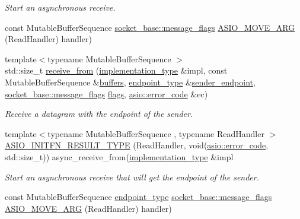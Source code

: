 \begin{DoxyCompactItemize}
\begin{DoxyCompactList}\small\item\em Start an asynchronous receive. \end{DoxyCompactList}\item 
const Mutable\+Buffer\+Sequence \hyperlink{classasio_1_1socket__base_ac3cf77465dfedfe1979b5415cf32cc94}{socket\+\_\+base\+::message\+\_\+flags} \hyperlink{classasio_1_1datagram__socket__service_a751d9e3b688d83f9af9c5e794574a2cc}{A\+S\+I\+O\+\_\+\+M\+O\+V\+E\+\_\+\+A\+R\+G} (Read\+Handler) handler)
\item 
{\footnotesize template$<$typename Mutable\+Buffer\+Sequence $>$ }\\std\+::size\+\_\+t \hyperlink{classasio_1_1datagram__socket__service_a84a1398434f93602d5f51d59974cbc49}{receive\+\_\+from} (\hyperlink{classasio_1_1datagram__socket__service_a41dcdc6b8a3500d6f88e10b6c08925cd}{implementation\+\_\+type} \&impl, const Mutable\+Buffer\+Sequence \&\hyperlink{classasio_1_1datagram__socket__service_a8d5deea235095a9d82c4d36af00eaa0f}{buffers}, \hyperlink{classasio_1_1datagram__socket__service_a135b71c44f1e92b67cea4402f46578a9}{endpoint\+\_\+type} \&\hyperlink{classasio_1_1datagram__socket__service_a5bfcc5dd1de590bc5c55e0c19db18773}{sender\+\_\+endpoint}, \hyperlink{classasio_1_1socket__base_ac3cf77465dfedfe1979b5415cf32cc94}{socket\+\_\+base\+::message\+\_\+flags} \hyperlink{classasio_1_1datagram__socket__service_a4bb3745dcca72273467ef14d34819736}{flags}, \hyperlink{classasio_1_1error__code}{asio\+::error\+\_\+code} \&ec)
\begin{DoxyCompactList}\small\item\em Receive a datagram with the endpoint of the sender. \end{DoxyCompactList}\item 
{\footnotesize template$<$typename Mutable\+Buffer\+Sequence , typename Read\+Handler $>$ }\\\hyperlink{classasio_1_1datagram__socket__service_ae8a08a52dcc1186c32e9ac494a6ccd1b}{A\+S\+I\+O\+\_\+\+I\+N\+I\+T\+F\+N\+\_\+\+R\+E\+S\+U\+L\+T\+\_\+\+T\+Y\+P\+E} (Read\+Handler, void(\hyperlink{classasio_1_1error__code}{asio\+::error\+\_\+code}, std\+::size\+\_\+t)) async\+\_\+receive\+\_\+from(\hyperlink{classasio_1_1datagram__socket__service_a41dcdc6b8a3500d6f88e10b6c08925cd}{implementation\+\_\+type} \&impl
\begin{DoxyCompactList}\small\item\em Start an asynchronous receive that will get the endpoint of the sender. \end{DoxyCompactList}\item 
const Mutable\+Buffer\+Sequence \hyperlink{classasio_1_1datagram__socket__service_a135b71c44f1e92b67cea4402f46578a9}{endpoint\+\_\+type} \hyperlink{classasio_1_1socket__base_ac3cf77465dfedfe1979b5415cf32cc94}{socket\+\_\+base\+::message\+\_\+flags} \hyperlink{classasio_1_1datagram__socket__service_a885ce2973e6a8ba98bd74a620d130afb}{A\+S\+I\+O\+\_\+\+M\+O\+V\+E\+\_\+\+A\+R\+G} (Read\+Handler) handler)
\end{DoxyCompactItemize}
